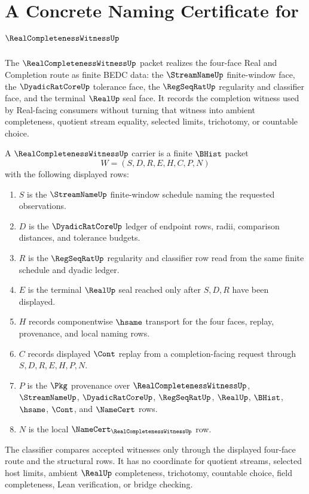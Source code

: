 \chapter{A Concrete Naming Certificate for $\RealCompletenessWitnessUp$}
\label{ch:concrete-instances-real-completeness-witness-namecert}

The $\RealCompletenessWitnessUp$ packet realizes the four-face Real and Completion route as finite BEDC data: the $\StreamNameUp$ finite-window face, the $\DyadicRatCoreUp$ tolerance face, the $\RegSeqRatUp$ regularity and classifier face, and the terminal $\RealUp$ seal face. It records the completion witness used by Real-facing consumers without turning that witness into ambient completeness, quotient stream equality, selected limits, trichotomy, or countable choice.

\begin{definition}
\label{def:real-completeness-witness-carrier}
A $\RealCompletenessWitnessUp$ carrier is a finite $\BHist$ packet
$$
W=(S,D,R,E,H,C,P,N)
$$
with the following displayed rows:
\begin{enumerate}
\item $S$ is the $\StreamNameUp$ finite-window schedule naming the requested observations.
\item $D$ is the $\DyadicRatCoreUp$ ledger of endpoint rows, radii, comparison distances, and tolerance budgets.
\item $R$ is the $\RegSeqRatUp$ regularity and classifier row read from the same finite schedule and dyadic ledger.
\item $E$ is the terminal $\RealUp$ seal reached only after $S,D,R$ have been displayed.
\item $H$ records componentwise $\hsame$ transport for the four faces, replay, provenance, and local naming rows.
\item $C$ records displayed $\Cont$ replay from a completion-facing request through $S,D,R,E,H,P,N$.
\item $P$ is the $\Pkg$ provenance over $\RealCompletenessWitnessUp$, $\StreamNameUp$, $\DyadicRatCoreUp$, $\RegSeqRatUp$, $\RealUp$, $\BHist$, $\hsame$, $\Cont$, and $\NameCert$ rows.
\item $N$ is the local $\NameCert_{\RealCompletenessWitnessUp}$ row.
\end{enumerate}
The classifier compares accepted witnesses only through the displayed four-face route and the structural rows. It has no coordinate for quotient streams, selected host limits, ambient $\RealUp$ completeness, trichotomy, countable choice, field completeness, Lean verification, or bridge checking.
\end{definition}

